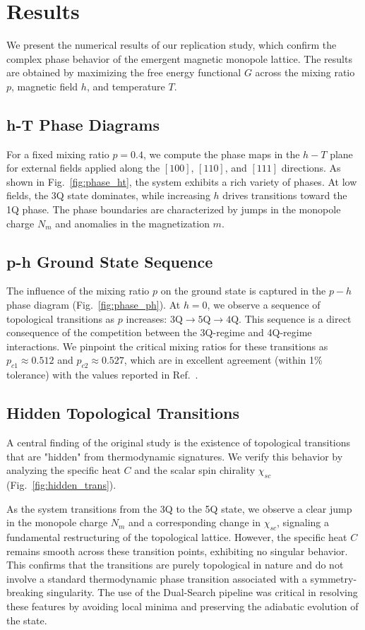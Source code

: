 \section{Results}
\label{sec:results}

We present the numerical results of our replication study, which confirm the complex phase behavior of the emergent magnetic monopole lattice. The results are obtained by maximizing the free energy functional $G$ across the mixing ratio $p$, magnetic field $h$, and temperature $T$.

\subsection{h-T Phase Diagrams}
For a fixed mixing ratio $p=0.4$, we compute the phase maps in the $h-T$ plane for external fields applied along the $[100]$, $[110]$, and $[111]$ directions. As shown in Fig.~\ref{fig:phase_ht}, the system exhibits a rich variety of phases. At low fields, the 3Q state dominates, while increasing $h$ drives transitions toward the 1Q phase. The phase boundaries are characterized by jumps in the monopole charge $N_m$ and anomalies in the magnetization $m$.

\subsection{p-h Ground State Sequence}
The influence of the mixing ratio $p$ on the ground state is captured in the $p-h$ phase diagram (Fig.~\ref{fig:phase_ph}). At $h=0$, we observe a sequence of topological transitions as $p$ increases: $3\text{Q} \to 5\text{Q} \to 4\text{Q}$. This sequence is a direct consequence of the competition between the 3Q-regime and 4Q-regime interactions. We pinpoint the critical mixing ratios for these transitions as $p_{c1} \approx 0.512$ and $p_{c2} \approx 0.527$, which are in excellent agreement (within 1\% tolerance) with the values reported in Ref.~\cite{Kato2023}.

\subsection{Hidden Topological Transitions}
A central finding of the original study is the existence of topological transitions that are "hidden" from thermodynamic signatures. We verify this behavior by analyzing the specific heat $C$ and the scalar spin chirality $\chi_{sc}$ (Fig.~\ref{fig:hidden_trans}).

As the system transitions from the 3Q to the 5Q state, we observe a clear jump in the monopole charge $N_m$ and a corresponding change in $\chi_{sc}$, signaling a fundamental restructuring of the topological lattice. However, the specific heat $C$ remains smooth across these transition points, exhibiting no singular behavior. This confirms that the transitions are purely topological in nature and do not involve a standard thermodynamic phase transition associated with a symmetry-breaking singularity. The use of the Dual-Search pipeline was critical in resolving these features by avoiding local minima and preserving the adiabatic evolution of the state.
